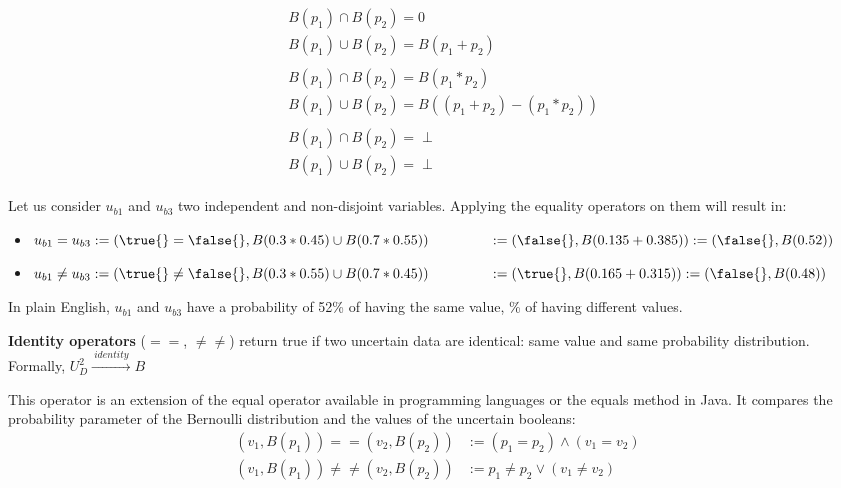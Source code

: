 \begin{align}
	\tag{Disjoint var.}
	\begin{split}
		& B(p_1) \cap B(p_2) = 0\\
		& B(p_1) \cup B(p_2) = B(p_1 + p_2)
	\end{split}\\
	\tag{Indep. and non-disjoint var.}
	\begin{split}
		& B(p_1) \cap B(p_2) = B(p_1 * p_2)\\
		& B(p_1) \cup B(p_2) = B((p_1 + p_2) - (p_1 * p_2))
	\end{split}\\
	\tag{Dep. and non-disjoint var.}
	\begin{split}
		& B(p_1) \cap B(p_2) = \perp\\
		& B(p_1) \cup B(p_2) = \perp
	\end{split}
\end{align}

Let us consider $u_{b1}$ and $u_{b3}$ two independent and non-disjoint variables.
Applying the equality operators on them will result in:
\begin{itemize}
	\vspace{-0.5em}
	\setlength\itemsep{-0.3em}
	\item $u_{b1} = u_{b3} := (\true{} = \false{}, B(0.3*0.45) \cup B(0.7*0.55))\\ ~~~~~~~~~~~~~ := (\false{}, B(0.135 + 0.385)) := (\false{}, B(0.52))$
	\item $u_{b1} \ne u_{b3} := (\true{} \ne \false{}, B(0.3*0.55) \cup B(0.7*0.45))\\ ~~~~~~~~~~~~~ := (\true{}, B(0.165 + 0.315)) := (\false{}, B(0.48))$
\end{itemize}
In plain English, $u_{b1}$ and $u_{b3}$ have a probability of 52\% of having the same value, \% of having different values.

\begin{operator}
	\label{op:s-equality}
	\textbf{Identity operators} ($==$, $\neq\neq$) return true if two uncertain data are identical: same value and same probability distribution. Formally, $U_D^2 \xrightarrow{~identity~} B$
\end{operator}

This operator is an extension of the equal operator available in programming languages or the equals method in Java.
It compares the probability parameter of the Bernoulli distribution and the values of the uncertain booleans:
\begin{align*}
	(v_1, B(p_1)) == (v_2, B(p_2)) &:= (p_1 = p_2) \land (v_1 = v_2)\\
	(v_1, B(p_1)) \ne\ne (v_2, B(p_2)) &:= p_1 \ne p_2 \lor (v_1 \ne v_2)
\end{align*}

